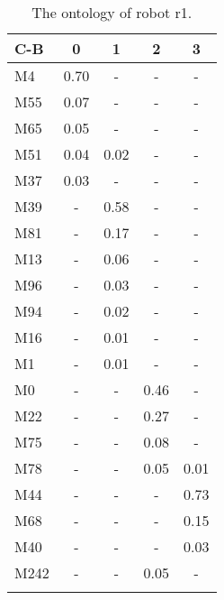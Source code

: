 \begin{table}[h]
\centering
{\footnotesize\begin{tabular}{lcccc}
\lsptoprule
C-B & 0 & 1 & 2 & 3\\\midrule
M4 & 0.70 & - & - & -\\\hline
M55 & 0.07 & - & - & -\\\hline
M65 & 0.05 & - & - & -\\\hline
M51 & 0.04 & 0.02 & - & -\\\hline
M37 & 0.03 & - & - & -\\\hline
M39 & - & 0.58 & - & -\\\hline
M81 & - & 0.17 & - & -\\\hline
M13 & - & 0.06 & - & -\\\hline
M96 & - & 0.03 & - & -\\\hline
M94 & - & 0.02 & - & -\\\hline
M16 & - & 0.01 & - & -\\\hline
M1 & - & 0.01 & - & -\\\hline
M0 & - & - & 0.46 & -\\\hline
M22 & - & - & 0.27 & -\\\hline
M75 & - & - & 0.08 & -\\\hline
M78 & - & - & 0.05 & 0.01\\\hline
M44 & - & - & - & 0.73\\\hline
M68 & - & - & - & 0.15\\\hline
M40 & - & - & - & 0.03\\\hline
M242 & - & - & 0.05 & -\\
\lspbottomrule
\end{tabular}}
\caption{The ontology of robot r1.}
\label{t:st:ontology1}
\end{table}

